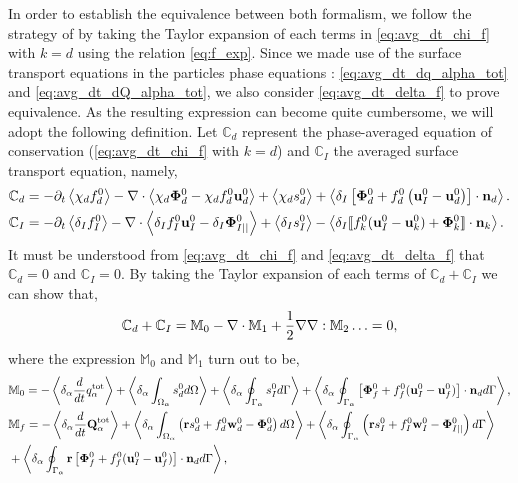 In order to establish the equivalence between both formalism, we follow the strategy of \citep{lhuillier2000bilan,lhuillier2009rheology} by taking the Taylor expansion of each terms in \ref{eq:avg_dt_chi_f} with $k=d$ using the relation \ref{eq:f_exp}. 
Since we made use of the surface transport equations in the particles phase equations : \ref{eq:avg_dt_dq_alpha_tot} and \ref{eq:avg_dt_dQ_alpha_tot}, we also consider \ref{eq:avg_dt_delta_f} to prove equivalence. 
As the resulting expression can become quite cumbersome, we will adopt the following definition. 
Let $\mathbb{C}_d$ represent the phase-averaged equation of conservation (\ref{eq:avg_dt_chi_f} with $k=d$) and $\mathbb{C}_I$ the averaged surface transport equation, namely, 
\begin{align*}
    \mathbb{C}_d
    &=
    - \partial_t \left<\chi_df_d^0\right>
    - \mathbf{\nabla}\cdot \left<\chi_d \mathbf{\Phi}_d^0 - \chi_df_d^0 \textbf{u}_d^0\right>
    + \left<\chi_d s_d^0\right>
    + \left<\delta_I\left[
        \mathbf{\Phi}_d^0
        + f_d^0
        \left(
            \textbf{u}_I^0
            - \textbf{u}_d^0
        \right)
    \right]
    \cdot \textbf{n}_d\right>.\\
    \mathbb{C}_I
    &= 
    -\partial_t \left<\delta_If_I^0\right>
    -\mathbf{\nabla}\cdot \left<\delta_I f_I^0 \textbf{u}_I^0-\delta_I \mathbf{\Phi}_{I||}^0 \right>
    + \left<\delta_Is_I^0\right> 
    - \left<\delta_I \llbracket 
    f_k^0 (\textbf{u}_I^0 - \textbf{u}_k^0)
    + \mathbf{\Phi}_k^0
     \rrbracket \cdot \textbf{n}_k \right>. 
\end{align*}
It must be understood from \ref{eq:avg_dt_chi_f} and \ref{eq:avg_dt_delta_f} that $\mathbb{C}_d=0$ and $\mathbb{C}_I=0$.
By taking the Taylor expansion of each terms of $\mathbb{C}_d+\mathbb{C}_I$ we can show that,
\begin{equation}
    \mathbb{C}_d 
    + \mathbb{C}_I 
    = \mathbb{M}_0 - \mathbf{\nabla}\cdot \mathbb{M}_1 + \frac{1}{2} \mathbf{\nabla}\mathbf{\nabla} : \mathbb{M}_2 \ldots = 0,
    \label{eq:scheme_equivalence}
\end{equation} 
where the expression $\mathbb{M}_0$ and $\mathbb{M}_1$ turn out to be, 
\begin{align*}
    &\mathbb{M}_0
    = 
    - \left<\delta_\alpha \frac{d}{dt} {q_\alpha^\text{tot}}\right>
    + \left<\delta_\alpha \int_{\Omega_{\alpha}}  s_d^0  d\Omega\right>
    + \left<\delta_\alpha \oint_{\Gamma_{\alpha}}  s_I^0  d\Gamma\right>
    + \left<\delta_\alpha \oint_{\Gamma_{\alpha}}  
    \left[\mathbf{\Phi}_f^0 
    + f_f^0 (\textbf{u}_I^0-\textbf{u}_f^0) \right] \cdot \textbf{n}_d  d\Gamma\right>,\\
    &\mathbb{M}_f =
    -  \left<\delta_\alpha \frac{d}{dt} {\textbf{Q}_\alpha^\text{tot}}\right>
     + \left<\delta_\alpha \int_{\Omega_{\alpha}}  \left(
        \textbf{r} s_d^0         
        + f_d^0  \textbf{w}_d^0 
        - \mathbf{\Phi}_d^0
    \right)  d\Omega\right>
    + \left<\delta_\alpha \oint_{\Gamma_{\alpha}}  \left(
        \textbf{r}s_I^0
        + f_I^0 \textbf{w}_I^0
        - \mathbf{\Phi}_{I||}^0
    \right)  d\Gamma\right>\\
    &+ \left<\delta_\alpha \oint_{\Gamma_{\alpha}}  \textbf{r} \left[
        \mathbf{\Phi}_f^0
        + f_f^0 (\textbf{u}_I^0-\textbf{u}_f^0)
    \right]\cdot \textbf{n}_d   d\Gamma\right>,
\end{align*}
